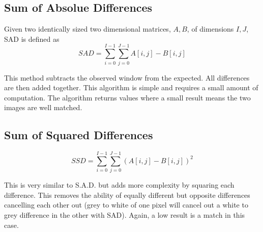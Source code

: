 \subsection{Sum of Absolue Differences}

Given two identically sized two dimensional matrices, $A, B$, of dimensions $I,J$, SAD is defined as
\begin{equation} \label{eq:SAD}
SAD = \sum\limits_{i=0}^{I-1} \sum\limits_{j=0}^{J-1} A[i,j] - B[i,j] 
\end{equation}

This method subtracts the observed window from the expected. All differences are then added together. This algorithm is simple and requires a small amount of computation. The algorithm returns values where a small result means the two images are well matched.

\subsection{Sum of Squared Differences}
\begin{equation}\label{eq:SSD}
SSD = \sum\limits_{i=0}^{I-1} \sum\limits_{j=0}^{J-1} (A[i,j] - B[i,j] )^2
\end{equation}

This is very similar to S.A.D. but adds more complexity by squaring each difference. This removes the ability of equally different but opposite differences cancelling each other out (grey to white of one pixel will cancel out a white to grey difference in the other with SAD). Again, a low result is a match in this case.

%


